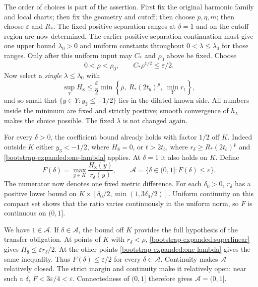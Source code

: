 \documentclass[11pt]{article}
\theoremstyle{definition}
\theoremstyle{remark}
\numberwithin{equation}{section}
\begin{document}
The order of choices is part of the assertion.  First fix the original
harmonic family and local charts; then fix the geometry and cutoff;
then choose $p,\eta,m$; then choose $\varepsilon$ and $R_*$.
The fixed positive separation ranges at $\delta=1$ and on the cutoff
region are now determined.  The earlier positive-separation
continuation must give one upper bound $\lambda_0>0$ and uniform
constants throughout $0<\lambda\leq\lambda_0$ for those ranges.
Only after this uniform input may $C_*$ and $\rho_0$ above be fixed.
Choose
\[
 0<\rho<\rho_0,\qquad C_*\rho^{1/2}\leq\varepsilon/2.
\]
Now select a \emph{single} $\lambda\leq\lambda_0$ with
\begin{equation}
 \sup_Y H_8\leq\frac\varepsilon2
   \min\left\{\rho,\ R_*(2t_b)^p,\ \min_Y r_1\right\},
 \label{bootstrap-expanded:one-lambda}
\end{equation}
and so small that $\{y\in Y:y_3\leq-1/2\}$ lies in the dilated
known side.  All numbers inside the minimum are fixed and strictly
positive; smooth convergence of $h_\lambda$ makes the choice possible.
The fixed $\lambda$ is not changed again.

For every $\delta>0$, the coefficient bound already holds with factor
$1/2$ off $K$.  Indeed outside $K$ either $y_3<-1/2$, where $H_8=0$,
or $t>2t_b$, where $r_\delta\geq R_*(2t_b)^p$ and
\eqref{bootstrap-expanded:one-lambda} applies.  At $\delta=1$ it also holds
on $K$.  Define
\[
 F(\delta)=\max_{y\in K}\frac{H_8(y)}{r_\delta(y)},
 \qquad \mathcal A=\{\delta\in(0,1]:F(\delta)\leq\varepsilon\}.
\]
The numerator now denotes one fixed metric difference.  For each
$\delta_0>0$, $r_\delta$ has a positive lower bound on
$K\times[\delta_0/2,\min(1,3\delta_0/2)]$.  Uniform continuity on
this compact set shows that the ratio varies continuously in the
uniform norm, so $F$ is continuous on $(0,1]$.

We have $1\in\mathcal A$.  If $\delta\in\mathcal A$, the bound
off $K$ provides the full hypothesis of the transfer obligation.
At points of $K$ with $r_\delta<\rho$,
\eqref{bootstrap-expanded:superlinear} gives $H_8\leq\varepsilon r_\delta/2$.
At the other points \eqref{bootstrap-expanded:one-lambda} gives the same
inequality.  Thus $F(\delta)\leq\varepsilon/2$ for every
$\delta\in\mathcal A$.  Continuity makes $\mathcal A$ relatively
closed.  The strict margin and continuity make it relatively open:
near such a $\delta$, $F<3\varepsilon/4<\varepsilon$.
Connectedness of $(0,1]$ therefore gives $\mathcal A=(0,1]$.
\end{document}
